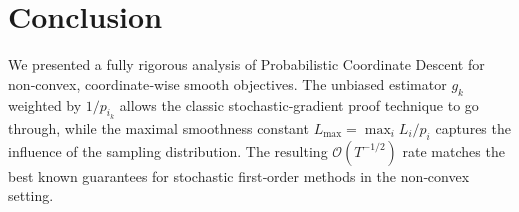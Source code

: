 \documentclass{article}
\begin{document}
\section*{Conclusion}
We presented a fully rigorous analysis of Probabilistic Coordinate Descent for non‑convex, coordinate‑wise smooth objectives. The unbiased estimator $g_k$ weighted by $1/p_{i_k}$ allows the classic stochastic‑gradient proof technique to go through, while the maximal smoothness constant $L_{\max}=\max_i L_i/p_i$ captures the influence of the sampling distribution. The resulting $\mathcal{O}(T^{-1/2})$ rate matches the best known guarantees for stochastic first‑order methods in the non‑convex setting.
\end{document}
